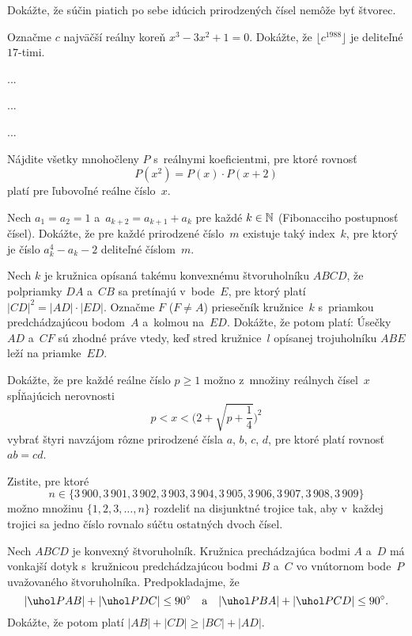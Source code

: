 {%
Dokážte, že súčin piatich po sebe idúcich
prirodzených čísel nemôže byť štvorec.}

{%
Označme $c$ najväčší reálny koreň
$x^3-3x^2+1=0$. Dokážte, že $\lfloor c^{1988}\rfloor$ je deliteľné
$17$-timi.}

{%
...}

{%
...}

{%
...}

{%
Nájdite všetky mnohočleny $P$ s~reálnymi koeficientmi, pre ktoré rovnosť
$$
P(x^2)=P(x)\cdot P(x+2)
$$
platí pre ľubovoľné reálne číslo~$x$.}

{%
Nech $a_1=a_2=1$ a~$a_{k+2}=a_{k+1}+a_{k}$ pre každé $k\in\Bbb N$ (Fibonacciho postupnosť čísel). Dokážte, že pre
každé prirodzené číslo~$m$ existuje taký index~$k$, pre ktorý je číslo $a_k^4-a_k-2$ deliteľné číslom~$m$.}

{%
Nech $k$ je kružnica opísaná takému konvexnému štvoruholníku $ABCD$, že polpriamky $DA$ a~$CB$ sa pretínajú v~bode~$E$, pre ktorý platí $|CD|^2=|AD|\cdot |ED|$. Označme $F$ ($F\ne A$) priesečník kružnice~$k$ s~priamkou predchádzajúcou bodom~$A$ a~kolmou na~$ED$. Dokážte, že potom platí: Úsečky $AD$ a~$CF$ sú zhodné práve vtedy, keď stred kružnice~$l$ opísanej trojuholníku $ABE$ leží na priamke~$ED$.}

{%
Dokážte, že pre každé reálne číslo $p\ge1$ možno z~množiny reálnych čísel~$x$ spĺňajúcich nerovnosti
$$
p<x<\biggl(2+\sqrt{p+\dfrac14}\biggr)^{\!2}
$$
vybrať štyri navzájom rôzne prirodzené čísla $a$, $b$, $c$, $d$, pre ktoré platí rovnosť $ab=cd$.}

{%
Zistite, pre ktoré
$$
n\in\{3\,900,3\,901,3\,902,3\,903,3\,904,3\,905,3\,906,3\,907,3\,908,3\,909\}
$$
možno množinu $\{1,2,3,\dots,n\}$ rozdeliť na disjunktné trojice tak, aby v~každej trojici sa jedno číslo rovnalo súčtu
ostatných dvoch čísel.}

{%
Nech $ABCD$ je konvexný štvoruholník. Kružnica prechádzajúca bodmi $A$ a~$D$ má vonkajší dotyk s~kružnicou predchádzajúcou bodmi $B$ a~$C$ vo vnútornom bode~$P$ uvažovaného štvoruholníka. Predpokladajme, že
$$
|\uhol PAB|+|\uhol PDC|\le 90^{\circ} \quad \hbox{a} \quad
       |\uhol PBA|+|\uhol PCD|\le 90^{\circ}.
$$
Dokážte, že potom platí $|AB|+|CD|\ge |BC|+|AD|$.}

